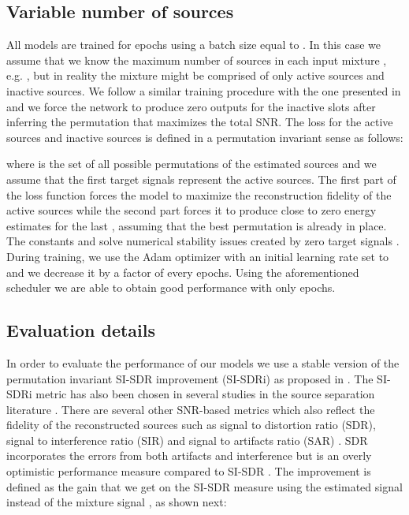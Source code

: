 \subsection{Variable number of sources}
All models are trained for  epochs using a batch size equal to . In this case we assume that we know the maximum number of sources in each input mixture , e.g. , but in reality the mixture might be comprised of only  active sources and  inactive sources. We follow a similar training procedure with the one presented in \cite{wisdom2020FUSS} and we force the network to produce zero outputs for the inactive slots after inferring the permutation that maximizes the total SNR. The loss for the active sources and inactive sources is defined in a permutation invariant sense as follows:

where  is the set of all possible permutations of the estimated sources  and we assume that the first  target signals represent the active sources. The first part of the loss function forces the model to maximize the reconstruction fidelity of the  active sources while the second part forces it to produce close to zero energy estimates for the last , assuming that the best permutation is already in place. The constants  and  solve numerical stability issues created by zero target signals . During training, we use the Adam optimizer \cite{adam} with an initial learning rate set to  and we decrease it by a 
factor of  every  epochs. Using the aforementioned scheduler we are able to obtain good performance with only  epochs.

\subsection{Evaluation details}
\label{sec:exp_setup:eval}
In order to evaluate the performance of our models we use a stable version of the permutation invariant SI-SDR improvement (SI-SDRi) as proposed in \cite{wisdom2020FUSS}. The SI-SDRi metric has also been chosen in several studies in the source separation literature \cite{tzinis2019improving,tzinis2019two,luo2019dual,zeghidour2020wavesplit,liu2019DeepCASA,wisdom2020FUSS}. There are several other SNR-based metrics which also reflect the fidelity of the reconstructed sources such as signal to distortion ratio (SDR), signal to interference ratio (SIR) and signal to artifacts ratio (SAR) \cite{vincent2006performance}. SDR incorporates the errors from both artifacts and interference but is an overly optimistic performance measure compared to SI-SDR \cite{le2019sdr}. The improvement is defined as the gain that we get on the SI-SDR measure using the estimated signal instead of the mixture signal , as shown next:

